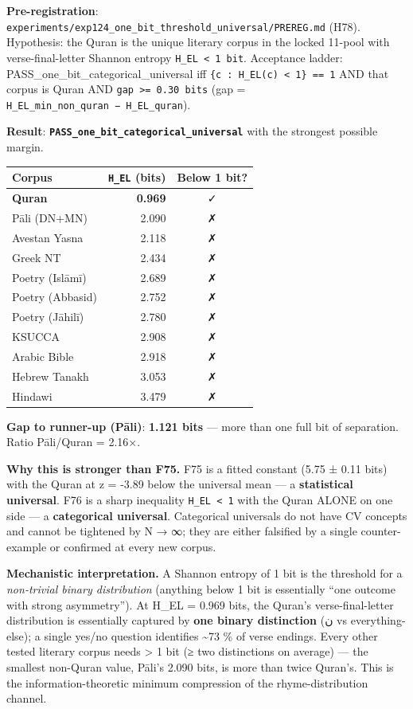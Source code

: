 \documentclass[
]{article}
\newcounter{none} %
\begin{document}
\textbf{Pre-registration}:
\texttt{experiments/exp124\_one\_bit\_threshold\_universal/PREREG.md}
(H78). Hypothesis: the Quran is the unique literary corpus in the locked
11-pool with verse-final-letter Shannon entropy
\texttt{H\_EL\ \textless{}\ 1\ bit}. Acceptance ladder:
PASS\_one\_bit\_categorical\_universal iff
\texttt{\textbar{}\{c\ :\ H\_EL(c)\ \textless{}\ 1\}\textbar{}\ ==\ 1}
AND that corpus is Quran AND \texttt{gap\ \textgreater{}=\ 0.30\ bits}
(gap = \texttt{H\_EL\_min\_non\_quran\ −\ H\_EL\_quran}).

\textbf{Result}:
\textbf{\texttt{PASS\_one\_bit\_categorical\_universal}} with the
strongest possible margin.

{\def\LTcaptype{none} %
\begin{longtable}[]{@{}lrc@{}}
\toprule\noalign{}
Corpus & \texttt{H\_EL} (bits) & Below 1 bit? \\
\midrule\noalign{}
\endhead
\bottomrule\noalign{}
\endlastfoot
\textbf{Quran} & \textbf{0.969} & ✓ \\
Pāli (DN+MN) & 2.090 & ✗ \\
Avestan Yasna & 2.118 & ✗ \\
Greek NT & 2.434 & ✗ \\
Poetry (Islāmī) & 2.689 & ✗ \\
Poetry (Abbasid) & 2.752 & ✗ \\
Poetry (Jāhilī) & 2.780 & ✗ \\
KSUCCA & 2.908 & ✗ \\
Arabic Bible & 2.918 & ✗ \\
Hebrew Tanakh & 3.053 & ✗ \\
Hindawi & 3.479 & ✗ \\
\end{longtable}
}

\textbf{Gap to runner-up (Pāli)}: \textbf{1.121 bits} --- more than one
full bit of separation. Ratio Pāli/Quran = 2.16×.

\textbf{Why this is stronger than F75.} F75 is a fitted constant (5.75 ±
0.11 bits) with the Quran at z = -3.89 below the universal mean --- a
\textbf{statistical universal}. F76 is a sharp inequality
\texttt{H\_EL\ \textless{}\ 1} with the Quran ALONE on one side --- a
\textbf{categorical universal}. Categorical universals do not have CV
concepts and cannot be tightened by N → ∞; they are either falsified by
a single counter-example or confirmed at every new corpus.

\textbf{Mechanistic interpretation.} A Shannon entropy of 1 bit is the
threshold for a \emph{non-trivial binary distribution} (anything below 1
bit is essentially ``one outcome with strong asymmetry''). At H\_EL =
0.969 bits, the Quran's verse-final-letter distribution is essentially
captured by \textbf{one binary distinction} (ن vs everything-else); a
single yes/no question identifies \textasciitilde73 \% of verse endings.
Every other tested literary corpus needs \textgreater{} 1 bit (≥ two
distinctions on average) --- the smallest non-Quran value, Pāli's 2.090
bits, is more than twice Quran's. This is the information-theoretic
minimum compression of the rhyme-distribution channel.
\end{document}
